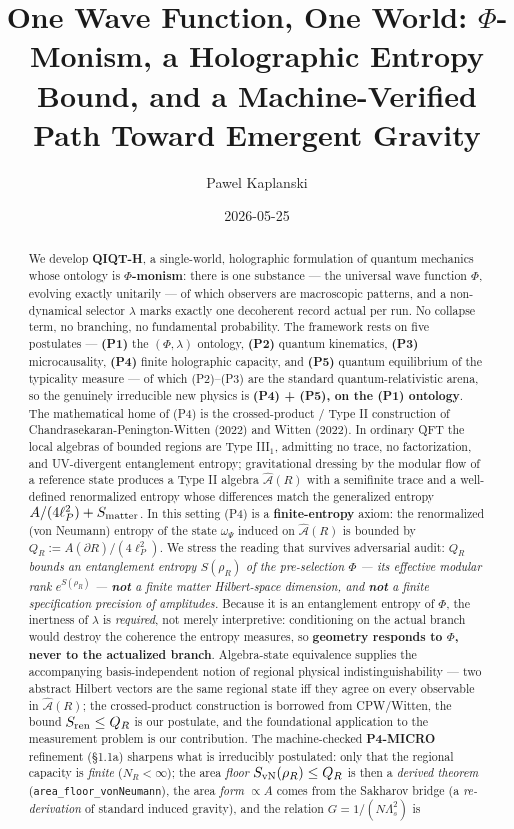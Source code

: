 \documentclass[11pt,a4paper]{article}
\title{One Wave Function, One World: $\Phi$-Monism, a Holographic Entropy Bound, and a Machine-Verified Path Toward Emergent Gravity}
\author{Pawel Kaplanski}
\date{2026-05-25}
\begin{document}
\maketitle

\begin{abstract}
\noindent We develop \textbf{QIQT-H}, a single-world, holographic formulation of quantum mechanics whose ontology is \textbf{$\Phi$-monism}: there is one substance — the universal wave function $\Phi$, evolving exactly unitarily — of which observers are macroscopic patterns, and a non-dynamical selector $\lambda$ marks exactly one decoherent record actual per run. No collapse term, no branching, no fundamental probability. The framework rests on five postulates — \textbf{(P1)} the $(\Phi,\lambda)$ ontology, \textbf{(P2)} quantum kinematics, \textbf{(P3)} microcausality, \textbf{(P4)} finite holographic capacity, and \textbf{(P5)} quantum equilibrium of the typicality measure — of which (P2)–(P3) are the standard quantum-relativistic arena, so the genuinely irreducible new physics is \textbf{(P4) + (P5), on the (P1) ontology}. The mathematical home of (P4) is the crossed-product / Type II construction of Chandrasekaran-Penington-Witten (2022) and Witten (2022). In ordinary QFT the local algebras of bounded regions are Type III$_1$, admitting no trace, no factorization, and UV-divergent entanglement entropy; gravitational dressing by the modular flow of a reference state produces a Type II algebra $\hat{\mathcal{A}}(R)$ with a semifinite trace and a well-defined renormalized entropy whose differences match the generalized entropy $A/(4\ell_P^2) + S_{\rm matter}$. In this setting (P4) is a \textbf{finite-entropy} axiom: the renormalized (von Neumann) entropy of the state $\omega_\Psi$ induced on $\hat{\mathcal{A}}(R)$ is bounded by $Q_R := A(\partial R)/(4\ell_P^2)$. We stress the reading that survives adversarial audit: \emph{$Q_R$ bounds an entanglement entropy $S(\rho_R)$ of the pre-selection $\Phi$ — its effective modular rank $e^{S(\rho_R)}$ — \textbf{not} a finite matter Hilbert-space dimension, and \textbf{not} a finite specification precision of amplitudes.} Because it is an entanglement entropy of $\Phi$, the inertness of $\lambda$ is \emph{required}, not merely interpretive: conditioning on the actual branch would destroy the coherence the entropy measures, so \textbf{geometry responds to $\Phi$, never to the actualized branch}. Algebra-state equivalence supplies the accompanying basis-independent notion of regional physical indistinguishability — two abstract Hilbert vectors are the same regional state iff they agree on every observable in $\hat{\mathcal{A}}(R)$; the crossed-product construction is borrowed from CPW/Witten, the bound $S_{\rm ren} \le Q_R$ is our postulate, and the foundational application to the measurement problem is our contribution. The machine-checked \textbf{P4-MICRO} refinement (§1.1a) sharpens what is irreducibly postulated: only that the regional capacity is \emph{finite} ($N_R<\infty$); the area \emph{floor} $S_{\rm vN}(\rho_R)\le Q_R$ is then a \emph{derived theorem} (\texttt{area\_floor\_vonNeumann}), the area \emph{form} $\propto A$ comes from the Sakharov bridge (a \emph{re-derivation} of standard induced gravity), and the relation $G = 1/(N\Lambda_s^2)$ is 
\end{abstract}
\end{document}
